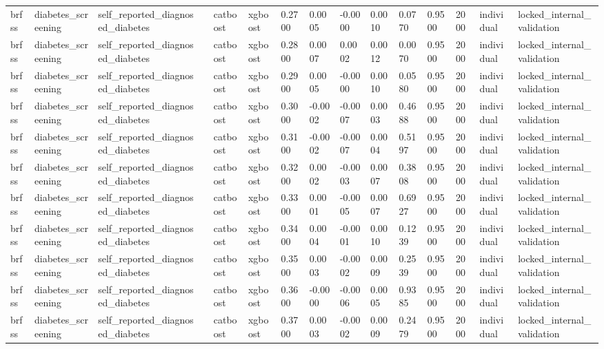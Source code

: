 \begin{tabular}{lllllllllllllll}
brfss & diabetes\_screening & self\_reported\_diagnosed\_diabetes &  & catboost & xgboost & 0.2700 & 0.0005 & -0.0000 & 0.0010 & 0.0770 & 0.9500 & 2000 & individual & locked\_internal\_validation \\
brfss & diabetes\_screening & self\_reported\_diagnosed\_diabetes &  & catboost & xgboost & 0.2800 & 0.0007 & 0.0002 & 0.0012 & 0.0070 & 0.9500 & 2000 & individual & locked\_internal\_validation \\
brfss & diabetes\_screening & self\_reported\_diagnosed\_diabetes &  & catboost & xgboost & 0.2900 & 0.0005 & -0.0000 & 0.0010 & 0.0580 & 0.9500 & 2000 & individual & locked\_internal\_validation \\
brfss & diabetes\_screening & self\_reported\_diagnosed\_diabetes &  & catboost & xgboost & 0.3000 & -0.0002 & -0.0007 & 0.0003 & 0.4688 & 0.9500 & 2000 & individual & locked\_internal\_validation \\
brfss & diabetes\_screening & self\_reported\_diagnosed\_diabetes &  & catboost & xgboost & 0.3100 & -0.0002 & -0.0007 & 0.0004 & 0.5197 & 0.9500 & 2000 & individual & locked\_internal\_validation \\
brfss & diabetes\_screening & self\_reported\_diagnosed\_diabetes &  & catboost & xgboost & 0.3200 & 0.0002 & -0.0003 & 0.0007 & 0.3808 & 0.9500 & 2000 & individual & locked\_internal\_validation \\
brfss & diabetes\_screening & self\_reported\_diagnosed\_diabetes &  & catboost & xgboost & 0.3300 & 0.0001 & -0.0005 & 0.0007 & 0.6927 & 0.9500 & 2000 & individual & locked\_internal\_validation \\
brfss & diabetes\_screening & self\_reported\_diagnosed\_diabetes &  & catboost & xgboost & 0.3400 & 0.0004 & -0.0001 & 0.0010 & 0.1239 & 0.9500 & 2000 & individual & locked\_internal\_validation \\
brfss & diabetes\_screening & self\_reported\_diagnosed\_diabetes &  & catboost & xgboost & 0.3500 & 0.0003 & -0.0002 & 0.0009 & 0.2539 & 0.9500 & 2000 & individual & locked\_internal\_validation \\
brfss & diabetes\_screening & self\_reported\_diagnosed\_diabetes &  & catboost & xgboost & 0.3600 & -0.0000 & -0.0006 & 0.0005 & 0.9385 & 0.9500 & 2000 & individual & locked\_internal\_validation \\
brfss & diabetes\_screening & self\_reported\_diagnosed\_diabetes &  & catboost & xgboost & 0.3700 & 0.0003 & -0.0002 & 0.0009 & 0.2479 & 0.9500 & 2000 & individual & locked\_internal\_validation \\

\end{tabular}
